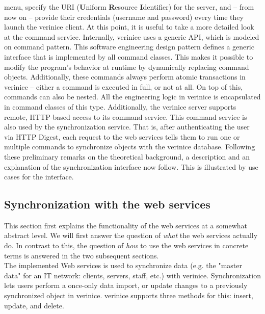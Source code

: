 \documentclass[a4paper,10pt]{book}
\begin{document}
menu, specify the URI (\textbf{U}niform \textbf{R}esource \textbf{I}dentifier) for the server, and – from now on – provide
their credentials (username and password) every time they launch the verinice client.
\newline
At this point, it is useful to take a more detailed look at the command service. Internally, verinice uses a
generic API, which is modeled on command pattern. This software engineering design pattern defines a generic
interface that is implemented by all command classes. This makes it possible to modify the program's behavior
at runtime by dynamically replacing command objects.
\newline
Additionally, these commands always perform atomic transactions in verinice – either a command is executed in
full, or not at all. On top of this, commands can also be nested. All the engineering logic in verinice is
encapsulated in command classes of this type. Additionally, the verinice server supports remote, HTTP-based
access to its command service.
\newline
This command service is also used by the synchronization service. That is, after authenticating the user via HTTP
Digest, each request to the web services tells them to run one or multiple commands to synchronize objects with the
verinice database.
\newline
Following these preliminary remarks on the theoretical background, a description and an explanation of the synchronization
interface now follow. This is illustrated by use cases for the interface.

\subsection{Synchronization with the web services}
This section first explains the functionality of the web services at a somewhat abstract level. We will first answer the question of
{\em what} the web services actually do. In contrast to this, the question of {\em how} to use the web services in concrete terms
is answered in the two subsequent sections.
\newline\\
The implemented Web services is used to synchronize data (e.g. the "master data" for an IT network: clients, servers, staff, etc.)
with verinice. Synchronization lets users perform a once-only data import, or update changes to a previously
synchronized object in verinice. verinice supports three methods for this: insert, update, and delete.
\end{document}
